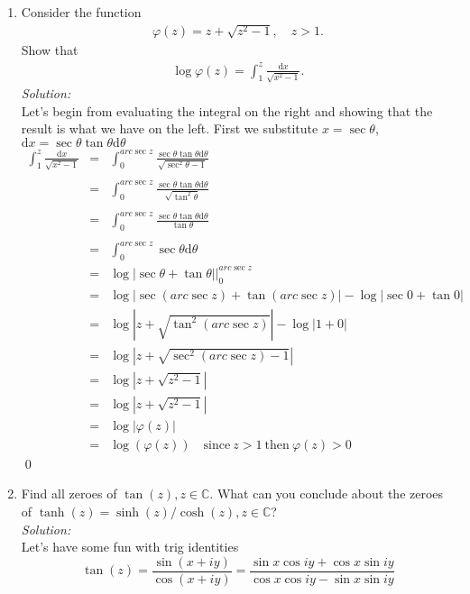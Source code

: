 \documentclass[10pt]{amsart}
\newcommand{\D}{\mathrm{d}}
\theoremstyle{nonumberplain}
\begin{document}
\begin{enumerate}[label={\bf {\arabic*}:}]
\item Consider the function
    \begin{align*}
      \varphi(z) = z + \sqrt{z^2 - 1}, \quad z > 1.
    \end{align*}
    Show that
    \begin{align*}
      \log \varphi(z) = \int_1^z \frac{\D x}{\sqrt{x^2 - 1}}.
    \end{align*}
\textit{Solution:} \\
Let's begin from evaluating the integral on the right and showing that the result is what we have on the left. First we substitute $x = \sec\theta$, $\D x = \sec\theta\tan\theta \D \theta$
\begin{eqnarray*}
\int_1^z \frac{\D x}{\sqrt{x^2 - 1}} &=& \int_0^{arc\sec z} \frac{\sec\theta\tan\theta \D \theta}{\sqrt{{\sec^2\theta} - 1}} \\ \\
&=& \int_0^{arc\sec z} \frac{ \sec \theta \tan \theta \D \theta}{\sqrt{\tan^2 \theta}} \\ \\
&=& \int_0^{arc\sec z} \frac{ \sec \theta \tan \theta \D \theta}{\tan \theta} \\ \\
&=& \int_0^{arc\sec z} \sec \theta \D \theta \\
&=& \log\left| \sec \theta + \tan\theta \right| |_{0}^{arc\sec z} \\
&=& \log\left| \sec (arc\sec z) + \tan(arc\sec z)\right| - \log\left| \sec 0 + \tan 0 \right| \\
&=& \log\left| z + \sqrt{\tan^2(arc\sec z)}\right| - \log\left| 1 + 0 \right| \\
&=& \log\left| z + \sqrt{\sec^2(arc\sec z) - 1}\right| \\
&=& \log\left| z + \sqrt{z^2 - 1} \right| \\
&=& \log\left| z + \sqrt{z^2 - 1} \right| \\
&=& \log\left|\varphi(z)\right| \\
&=& \log(\varphi(z)) \quad \text{since} \: z > 1 \: \text{then} \: \varphi(z) > 0 
\end{eqnarray*}
\qed
\item Find all zeroes of $\tan (z), z \in \mathbb{C}$. What can you
  conclude about the zeroes of $\tanh (z)=\sinh (z) / \cosh (z), z \in
  \mathbb C$?\\
\textit{Solution:} \\
Let's have some fun with trig identities 
$$\tan(z) = \frac{\sin(x + iy)}{\cos(x + iy)} = \frac{\sin x\cos iy + \cos x \sin iy }{\cos x \cos iy  - \sin x \sin iy}$$

\end{enumerate}
\end{document}
